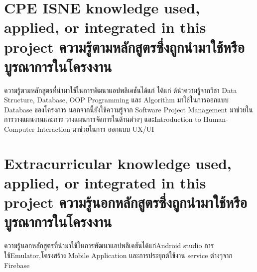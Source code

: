 \section{\ifenglish%
\ifcpe CPE \else ISNE \fi knowledge used, applied, or integrated in this project
\else%
ความรู้ตามหลักสูตรซึ่งถูกนำมาใช้หรือบูรณาการในโครงงาน
\fi
}

\quad \quad ความรู้ตามหลักสูตรที่นํามาใช้ในการพัฒนาแอปพลิเคชันได้แก่ ได้แก่ ด้นําความรู้จากวิชา Data Structure, Database, OOP Programming และ Algorithm มาใช้ในการออกแบบ Database ของโครงการ นอกจากนี้ยังใช้ความรู้จาก Software Project Management มาช่วยในการวางแผนงานและการ
วางแผนการจัดการในด้านต่างๆ และIntroduction to Human-Computer Interaction มาช่วยในการ
ออกแบบ UX/UI

\section{\ifenglish%
Extracurricular knowledge used, applied, or integrated in this project
\else%
ความรู้นอกหลักสูตรซึ่งถูกนำมาใช้หรือบูรณาการในโครงงาน
\fi
}

\quad \quad ความรู้นอกหลักสูตรที่นํามาใช้ในการพัฒนาแอปพลิเคชันได้แก่Android studio การใช้Emulator,โครงสร้าง
Mobile Application และการประยุกต์ใช้งาน service ต่างๆจาก Firebase
